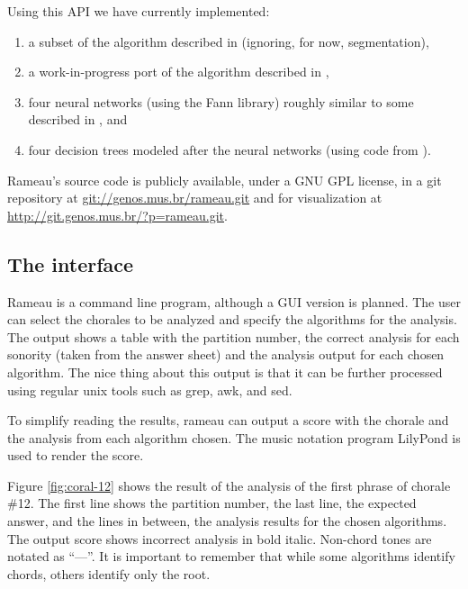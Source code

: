 \documentclass{article}
\begin{document}
Using this API we have currently implemented:

\begin{enumerate}
\item a subset of the algorithm described in \cite{pardo.ea:algorithms}
  (ignoring, for now, segmentation), 
\item a work-in-progress port of the algorithm described in
  \cite{temperley.ea:modeling}, 
\item four neural networks (using the Fann \cite{nissen:fann}
  library) roughly similar to some described in
  \cite{tsui:harmonic}, and
\item four decision trees modeled after the neural networks (using code
  from \cite{mitchell:machine}).
\end{enumerate}

Rameau's source code is publicly available, under a GNU GPL
\cite{fsf:gpl} license, in a git \cite{baudis:git} repository at
\url{git://genos.mus.br/rameau.git} and for visualization at
\url{http://git.genos.mus.br/?p=rameau.git}.

\subsection{The interface}
\label{sec:analysis-output}

Rameau is a command line program, although a GUI version is planned.
The user can select the chorales to be analyzed and specify the
algorithms for the analysis. The output shows a table with the
partition number, the correct analysis for each sonority (taken from
the answer sheet) and the analysis output for each chosen algorithm.
The nice thing about this output is that it can be further processed
using regular unix tools such as grep, awk, and sed.

To simplify reading the results, rameau can output a score with the
chorale and the analysis from each algorithm chosen. The music
notation program LilyPond \cite{nienhuys.ea:lilypond} is used to
render the score.

Figure \ref{fig:coral-12} shows the result of the analysis of the
first phrase of chorale \#12. The first line shows the partition
number, the last line, the expected answer, and the lines in between,
the analysis results for the chosen algorithms. The output score shows
incorrect analysis in bold italic. Non-chord tones are notated as
``—''. It is important to remember that while some algorithms identify
chords, others identify only the root.
\end{document}
